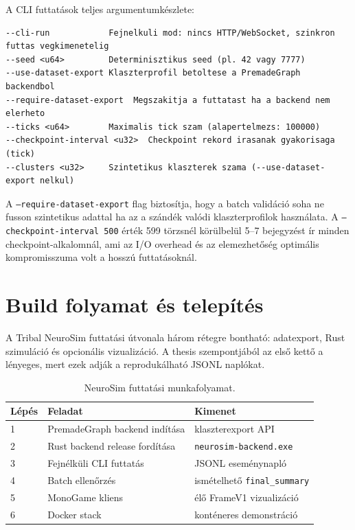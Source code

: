 ﻿\documentclass[a4paper,12pt]{report}
\begin{document}
A CLI futtatások teljes argumentumkészlete:
\begin{lstlisting}[language={},caption={CLI argumentumok és hatásuk}]
--cli-run            Fejnelkuli mod: nincs HTTP/WebSocket, szinkron futtas vegkimenetelig
--seed <u64>         Determinisztikus seed (pl. 42 vagy 7777)
--use-dataset-export Klaszterprofil betoltese a PremadeGraph backendbol
--require-dataset-export  Megszakitja a futtatast ha a backend nem elerheto
--ticks <u64>        Maximalis tick szam (alapertelmezs: 100000)
--checkpoint-interval <u32>  Checkpoint rekord irasanak gyakorisaga (tick)
--clusters <u32>     Szintetikus klaszterek szama (--use-dataset-export nelkul)
\end{lstlisting}

A \texttt{--require-dataset-export} flag biztosítja, hogy a batch validáció
soha ne fusson szintetikus adattal ha az a szándék valódi klaszterprofilok használata.
A \texttt{--checkpoint-interval 500} érték 599 törzsnél körülbelül 5--7 bejegyzést
ír minden checkpoint-alkalomnál, ami az I/O overhead és az elemezhetőség optimális
kompromisszuma volt a hosszú futtatásoknál.

\section{Build folyamat és telepítés}
\label{sec:neurosim-24-build}

A Tribal NeuroSim futtatási útvonala három rétegre bontható: adatexport,
Rust szimuláció és opcionális vizualizáció. A thesis szempontjából az első kettő
a lényeges, mert ezek adják a reprodukálható JSONL naplókat.

\begin{table}[h]
\centering
\caption{NeuroSim futtatási munkafolyamat.}
\label{tab:neurosim-build-flow}
\begin{tabular}{lll}
\hline
\textbf{Lépés} & \textbf{Feladat} & \textbf{Kimenet} \\
\hline
1 & PremadeGraph backend indítása & klaszterexport API \\
2 & Rust backend release fordítása & \texttt{neurosim-backend.exe} \\
3 & Fejnélküli CLI futtatás & JSONL eseménynapló \\
4 & Batch ellenőrzés & ismételhető \texttt{final\_summary} \\
5 & MonoGame kliens & élő FrameV1 vizualizáció \\
6 & Docker stack & konténeres demonstráció \\
\hline
\end{tabular}
\end{table}
\end{document}

